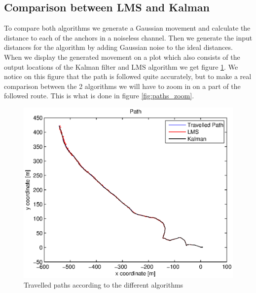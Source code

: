 \documentclass[a4paper]{article}        %
\begin{document}
\subsection{Comparison between LMS and Kalman}

To compare both algorithms we generate a Gaussian movement and calculate the distance to each of the anchors in a noiseless channel. Then we generate the input distances for the algorithm by adding Gaussian noise to the ideal distances.
When we display the generated movement on a plot which also consists of the output locations of the Kalman filter and LMS algorithm we get figure \ref{fig:paths}.
We notice on this figure that the path is followed quite accurately, but to make a real comparison between the 2 algorithms we will have to zoom in on a part of the followed route. This is what is done in figure \ref{fig:paths_zoom}.	

			\begin{figure}[H]
				\centering
				\includegraphics[width=\textwidth]{images/tracking_algorithms.eps}
				\caption{Travelled paths according to the different algorithms}
				\label{fig:paths}
			\end{figure}

		
			
\end{document}
